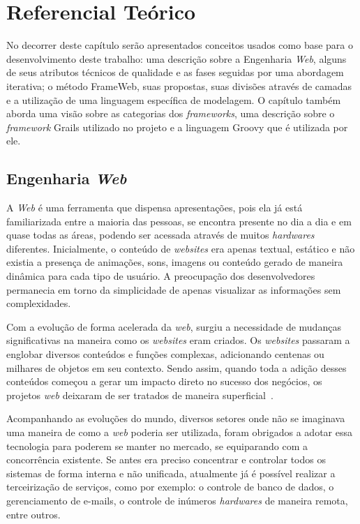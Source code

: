 \chapter{Referencial Teórico}
\label{sec-referencial}

No decorrer deste capítulo serão apresentados conceitos usados como base para o desenvolvimento deste trabalho: uma descrição sobre a Engenharia \textit{Web}, alguns de seus atributos técnicos de qualidade e as fases seguidas por uma abordagem iterativa; o método FrameWeb, suas propostas, suas divisões através de camadas e a utilização de uma linguagem específica de modelagem. O capítulo também aborda uma visão sobre as categorias dos \textit{frameworks}, uma descrição sobre o \textit{framework} Grails utilizado no projeto e a linguagem Groovy que é utilizada por ele.      

\section{Engenharia \textit{Web}}
\label{sec-ref-engenharia-web}


A \textit{Web} é uma ferramenta que dispensa apresentações, pois ela já está familiarizada entre a maioria das pessoas, se encontra presente no dia a dia e em quase todas as áreas, podendo ser acessada através de muitos \textit{hardwares} diferentes. Inicialmente, o conteúdo de \textit{websites} era apenas textual, estático e não existia a presença de animações, sons, imagens ou conteúdo gerado de maneira dinâmica para cada tipo de usuário. A preocupação dos desenvolvedores permanecia em torno da simplicidade de apenas visualizar as informações sem complexidades.

Com a evolução de forma acelerada da \textit{web}, surgiu a necessidade de mudanças significativas na maneira como os \textit{websites} eram criados. Os \textit{websites} passaram a englobar diversos conteúdos e funções complexas, adicionando centenas ou milhares de objetos em seu contexto. Sendo assim, quando toda a adição desses conteúdos começou a gerar um impacto direto no sucesso dos negócios, os projetos \textit{web} deixaram de ser tratados de maneira superficial~\cite{pressman:es11}.

Acompanhando as evoluções do mundo, diversos setores onde não se imaginava uma maneira de como a \textit{web} poderia ser utilizada, foram obrigados a adotar essa tecnologia para poderem se manter no mercado, se equiparando com a concorrência existente. Se antes era preciso concentrar e controlar todos os sistemas de forma interna e não unificada, atualmente já é possível realizar a terceirização de serviços, como por exemplo: o controle de banco de dados, o gerenciamento de e-mails, o controle de inúmeros \textit{hardwares} de maneira remota, entre outros.

